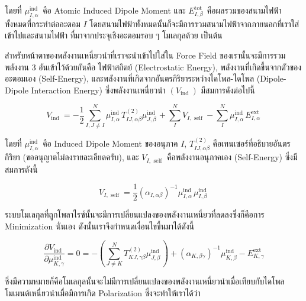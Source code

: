 \noindent โดยที่ $\mu_{I, \alpha}^{\text {ind }}$ คือ Atomic Induced Dipole Moment และ $E_{I, \beta}^{\text {tot }}$
คือผลรวมของสนามไฟฟ้าทั้งหมดที่กระทำต่ออะตอม $I$ โดยสนามไฟฟ้าทั้งหมดนั้นก็จะมีการรวมสนามไฟฟ้าจากภายนอกที่เราใส่เข้าไปและสนามไฟฟ้า%
ที่มาจากประจุเชิงอะตอมรอบ ๆ โมเลกุลด้วย เป็นต้น

สำหรับหน้าตาของพลังงานเหนี่ยวนำที่เราจะนำเข้าไปใส่ใน Force Field ของเรานั้นจะมีการรวมพลังงาน 3 อันเข้าไว้ด้วยกันคือ ไฟฟ้าสถิตย์
(Electrostatic Energy), พลังงานที่เกิดขึ้นจากตัวของอะตอมเอง (Self-Energy), และพลังงานที่เกิดจากอันตรกิริยาระหว่างไดโพล-ไดโพล
(Dipole-Dipole Interaction Energy) ซึ่งพลังงานเหนี่ยวนำ $(V_{\text {ind }})$ มีสมการดังต่อไปนี้\autocite{vesely1977}

\begin{equation}
  V_{\text {ind }}
  =
  -\frac{1}{2} \sum_{I, J
    \neq I}^N \mu_{I, \alpha}^{\text {ind }} T_{I J, \alpha \beta}^{(2)}
  \mu_{J, \beta}^{\text {ind }}
  + \sum_I^N V_{I, \text { self }}
  - \sum_I^N \mu_{I, \alpha}^{\text {ind }} E_{I, \alpha}^{\text {ext }}
\end{equation}

\noindent โดยที่ $\mu_{I, \alpha}^{\text {ind }}$ คือ Induced Dipole Moment ของอนุภาค $I$,
$T_{I J, \alpha \beta}^{(2)}$ คือเทนเซอร์ที่อธิบายอันตรกิริยา (ขออนุญาตไม่ลงรายละเอียดครับ), และ $V_{I, \text { self }}$
คือพลังงานอนุภาคเอง (Self-Energy) ซึ่งมีสมการดังนี้

\begin{equation}
  V_{I, \text { self }}
  =
  \frac{1}{2}\left(\alpha_{I, \alpha \beta}\right)^{-1} \mu_{I, \alpha}^{\text {ind }} \mu_{I, \beta}^{\text {ind }}
\end{equation}

ระบบโมเลกุลที่ถูกโพลาไรซ์นั้นจะมีการเปลี่ยนแปลงของพลังงานเหนี่ยวที่ลดลงซึ่งก็คือการ Minimization นั่นเอง ดังนั้นเราจึงกำหนดเงื่อนไขขึ้นมาได้ดังนี้

\begin{equation}
  \label{eq:der_induction_energy}
  \frac{\partial V_{\text {ind }}}{\partial \mu_{K, \gamma}^{\text {ind }}}
  =
  0
  =
  -\left(\sum_{J \neq K}^N T_{K J, \gamma \beta}^{(2)} \mu_{J, \beta}^{\text {ind }}\right)+\left(\alpha_{K, \beta \gamma}\right)^{-1} \mu_{K, \beta}^{\text {ind }}-E_{K, \gamma}^{\text {ext }}
\end{equation}

\noindent ซึ่งมีความหมายก็คือโมเลกุลนั้นจะไม่มีการเปลี่ยนแปลงของพลังงานเหนี่ยวนำเมื่อเทียบกับไดโพลโมเมนต์เหนี่ยวนำเมื่อมีการเกิด Polarization
ซึ่งจะทำให้เราได้ว่า

